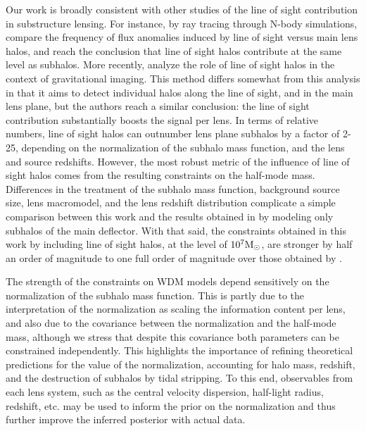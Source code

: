 Our work is broadly consistent with other studies of the line of sight contribution in substructure lensing. For instance, by ray tracing through N-body simulations, \cite{Xu++12} compare the frequency of flux anomalies induced by line of sight versus main lens halos, and reach the conclusion that line of sight halos contribute at the same level as subhalos. More recently, \cite{Despali++18} analyze the role of line of sight halos in the context of gravitational imaging. This method differs somewhat from this analysis in that it aims to detect individual halos along the line of sight, and in the main lens plane, but the authors reach a similar conclusion: the line of sight contribution substantially boosts the signal per lens. In terms of relative numbers, line of sight halos can outnumber lens plane subhalos by a factor of 2-25, depending on the normalization of the subhalo mass function, and the lens and source redshifts. However, the most robust metric of the influence of line of sight halos comes from the resulting constraints on the half-mode mass. Differences in the treatment of the subhalo mass function, background source size, lens macromodel, and the lens redshift distribution complicate a simple comparison between this work and the results obtained in \cite{Gilman++18} by modeling only subhalos of the main deflector. With that said, the constraints obtained in this work by including line of sight halos, at the level of $10^{7} {\rm{M}_{\odot}}$, are stronger by half an order of magnitude to one full order of magnitude over those obtained by \cite{Gilman++18}.

The strength of the constraints on WDM models depend sensitively on the normalization of the subhalo mass function. This is partly due to the interpretation of the normalization as scaling the information content per lens, and also due to the covariance between the normalization and the half-mode mass, although we stress that despite this covariance both parameters can be constrained independently. This highlights the importance of refining theoretical predictions for the value of the normalization, accounting for halo mass, redshift, and the destruction of subhalos by tidal stripping. To this end, observables from each lens system, such as the central velocity dispersion, half-light radius, redshift, etc. may be used to inform the prior on the normalization and thus further improve the inferred posterior with actual data. 


